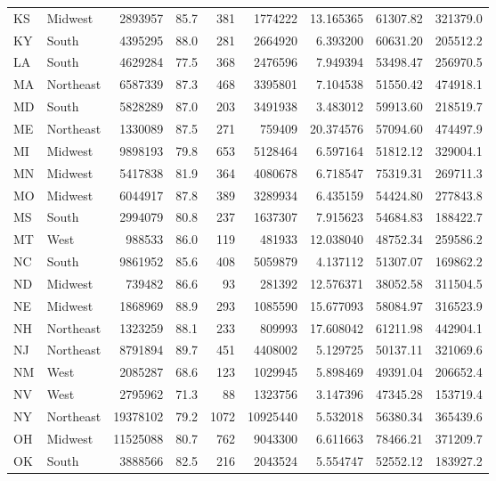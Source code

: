 \documentclass[12pt,]{article}
\begin{document}
\begin{table}[!h]
{\begin{tabular}[t]{llrrrrrrr}
\addlinespace
KS & Midwest & 2893957 & 85.7 & 381 & 1774222 & 13.165365 & 61307.82 & 321379.0\\
KY & South & 4395295 & 88.0 & 281 & 2664920 & 6.393200 & 60631.20 & 205512.2\\
LA & South & 4629284 & 77.5 & 368 & 2476596 & 7.949394 & 53498.47 & 256970.5\\
MA & Northeast & 6587339 & 87.3 & 468 & 3395801 & 7.104538 & 51550.42 & 474918.1\\
MD & South & 5828289 & 87.0 & 203 & 3491938 & 3.483012 & 59913.60 & 218519.7\\
\addlinespace
ME & Northeast & 1330089 & 87.5 & 271 & 759409 & 20.374576 & 57094.60 & 474497.9\\
MI & Midwest & 9898193 & 79.8 & 653 & 5128464 & 6.597164 & 51812.12 & 329004.1\\
MN & Midwest & 5417838 & 81.9 & 364 & 4080678 & 6.718547 & 75319.31 & 269711.3\\
MO & Midwest & 6044917 & 87.8 & 389 & 3289934 & 6.435159 & 54424.80 & 277843.8\\
MS & South & 2994079 & 80.8 & 237 & 1637307 & 7.915623 & 54684.83 & 188422.7\\
\addlinespace
MT & West & 988533 & 86.0 & 119 & 481933 & 12.038040 & 48752.34 & 259586.2\\
NC & South & 9861952 & 85.6 & 408 & 5059879 & 4.137112 & 51307.07 & 169862.2\\
ND & Midwest & 739482 & 86.6 & 93 & 281392 & 12.576371 & 38052.58 & 311504.5\\
NE & Midwest & 1868969 & 88.9 & 293 & 1085590 & 15.677093 & 58084.97 & 316523.9\\
NH & Northeast & 1323259 & 88.1 & 233 & 809993 & 17.608042 & 61211.98 & 442904.1\\
\addlinespace
NJ & Northeast & 8791894 & 89.7 & 451 & 4408002 & 5.129725 & 50137.11 & 321069.6\\
NM & West & 2085287 & 68.6 & 123 & 1029945 & 5.898469 & 49391.04 & 206652.4\\
NV & West & 2795962 & 71.3 & 88 & 1323756 & 3.147396 & 47345.28 & 153719.4\\
NY & Northeast & 19378102 & 79.2 & 1072 & 10925440 & 5.532018 & 56380.34 & 365439.6\\
OH & Midwest & 11525088 & 80.7 & 762 & 9043300 & 6.611663 & 78466.21 & 371209.7\\
\addlinespace
OK & South & 3888566 & 82.5 & 216 & 2043524 & 5.554747 & 52552.12 & 183927.2\\

\end{tabular}}
\end{table}
\end{document}

